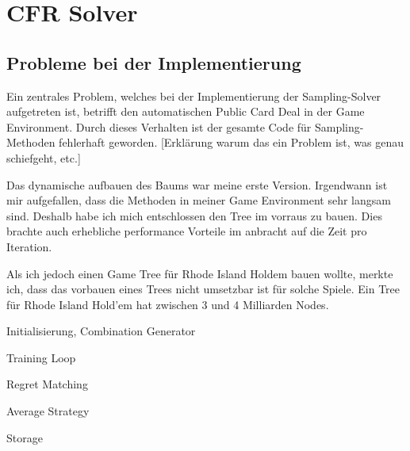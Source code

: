 \section{CFR Solver}
\subsection{Probleme bei der Implementierung}

Ein zentrales Problem, welches bei der Implementierung der Sampling-Solver 
aufgetreten ist, betrifft den automatischen Public Card Deal in der Game Environment.
Durch dieses Verhalten ist der gesamte Code für Sampling-Methoden fehlerhaft geworden.
[Erklärung warum das ein Problem ist, was genau schiefgeht, etc.]

Das dynamische aufbauen des Baums war meine erste Version. 
Irgendwann ist mir aufgefallen, dass die Methoden in meiner Game Environment sehr langsam sind.
Deshalb habe ich mich entschlossen den Tree im vorraus zu bauen. 
Dies brachte auch erhebliche performance Vorteile im anbracht auf die Zeit pro Iteration.

Als ich jedoch einen Game Tree für Rhode Island Holdem bauen wollte, merkte ich, dass das vorbauen eines Trees nicht umsetzbar ist für solche Spiele.
Ein Tree für Rhode Island Hold'em hat zwischen 3 und 4 Milliarden Nodes. 


Initialisierung, Combination Generator

Training Loop

Regret Matching

Average Strategy

Storage


